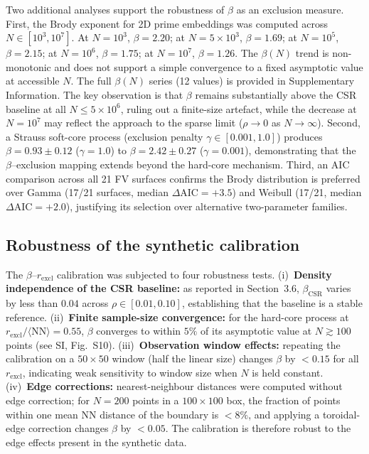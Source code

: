 \documentclass[final,1p,times]{elsarticle}
\theoremstyle{definition}
\begin{document}
Two additional analyses support the robustness of $\beta$
as an exclusion measure. First, the Brody exponent for 2D prime
embeddings was computed across $N \in [10^3, 10^7]$. At
$N=10^3$, $\beta=2.20$; at $N=5\times10^3$, $\beta=1.69$;
at $N=10^5$, $\beta=2.15$; at $N=10^6$, $\beta=1.75$;
at $N=10^7$, $\beta=1.26$. The $\beta(N)$ trend is
non-monotonic and does not support a simple convergence to a
fixed asymptotic value at accessible $N$. The full $\beta(N)$
series (12 values) is provided in Supplementary Information.
The key observation is that $\beta$ remains substantially above
the CSR baseline at all $N \leq 5\times10^6$, ruling out a
finite-size artefact, while the decrease at $N=10^7$ may
reflect the approach to the sparse limit ($\rho \to 0$ as
$N\to\infty$). Second, a Strauss soft-core
process (exclusion penalty $\gamma \in [0.001, 1.0]$)
produces $\beta = 0.93 \pm 0.12$ ($\gamma=1.0$) to
$\beta = 2.42 \pm 0.27$ ($\gamma=0.001$), demonstrating that
the $\beta$--exclusion mapping extends beyond the hard-core
mechanism. Third, an AIC
comparison across all 21 FV surfaces confirms the Brody
distribution is preferred over Gamma (17/21 surfaces,
median $\Delta\text{AIC} = +3.5$) and Weibull (17/21,
median $\Delta\text{AIC} = +2.0$), justifying its selection
over alternative two-parameter families.

\subsection{Robustness of the synthetic calibration}

The $\beta$--$r_{\text{excl}}$ calibration was subjected to four
robustness tests. (i)~\textbf{Density independence of the CSR
baseline:} as reported in Section~3.6, $\beta_{\text{CSR}}$ varies
by less than $0.04$ across $\rho \in [0.01, 0.10]$, establishing
that the baseline is a stable reference. (ii)~\textbf{Finite
sample-size convergence:} for the hard-core process at
$r_{\text{excl}}/\langle\text{NN}\rangle = 0.55$, $\beta$ converges
to within $5\%$ of its asymptotic value at $N \gtrsim 100$ points
(see SI, Fig.~S10). (iii)~\textbf{Observation window effects:}
repeating the calibration on a $50\times50$ window (half the linear
size) changes $\beta$ by $< 0.15$ for all $r_{\text{excl}}$, indicating
weak sensitivity to window size when $N$ is held constant.
(iv)~\textbf{Edge corrections:} nearest-neighbour distances were
computed without edge correction; for $N=200$ points in a
$100\times100$ box, the fraction of points within one mean NN
distance of the boundary is $< 8\%$, and applying a
toroidal-edge correction changes $\beta$ by $< 0.05$. The
calibration is therefore robust to the edge effects present in
the synthetic data.
\end{document}
